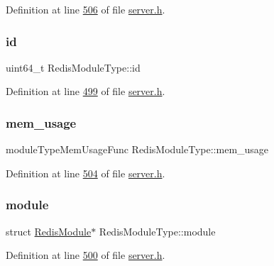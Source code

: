 Definition at line \hyperlink{server_8h_source_l00506}{506} of file \hyperlink{server_8h_source}{server.\+h}.

\mbox{\label{structRedisModuleType_ac21bc5854da3d77ce8b8dc5a1c46f6d9}} 
\subsubsection{\texorpdfstring{id}{id}}
{\footnotesize\ttfamily uint64\+\_\+t Redis\+Module\+Type\+::id}



Definition at line \hyperlink{server_8h_source_l00499}{499} of file \hyperlink{server_8h_source}{server.\+h}.

\mbox{\label{structRedisModuleType_a8619a7d6ada90e18888bc1ae2e97c8fc}} 
\subsubsection{\texorpdfstring{mem\+\_\+usage}{mem\_usage}}
{\footnotesize\ttfamily module\+Type\+Mem\+Usage\+Func Redis\+Module\+Type\+::mem\+\_\+usage}



Definition at line \hyperlink{server_8h_source_l00504}{504} of file \hyperlink{server_8h_source}{server.\+h}.

\mbox{\label{structRedisModuleType_aa61600daf63402137e7bba63af922c13}} 
\subsubsection{\texorpdfstring{module}{module}}
{\footnotesize\ttfamily struct \hyperlink{structRedisModule}{Redis\+Module}$\ast$ Redis\+Module\+Type\+::module}



Definition at line \hyperlink{server_8h_source_l00500}{500} of file \hyperlink{server_8h_source}{server.\+h}.

\mbox{\label{structRedisModuleType_ac3a27f8a26dbc2775bcdeb6ad8a26dca}} 
